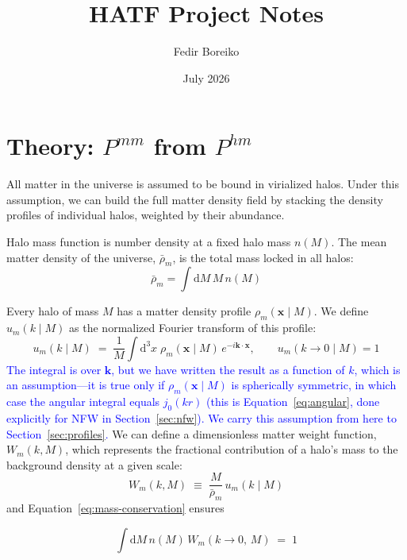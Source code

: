 \documentclass{article}
\title{HATF Project Notes}
\author{Fedir Boreiko}
\date{July 2026}
\newcommand{\dd}{\mathrm{d}}
\newcommand{\bx}{\mathbf{x}}
\newcommand{\bk}{\mathbf{k}}
\begin{document}
\section{Theory: $P^{mm}$ from $P^{hm}$}

All matter in the universe is assumed to be bound in virialized halos. Under this assumption, we can build the full matter density field by stacking the density profiles of individual halos, weighted by their abundance.

Halo mass function is number density at a fixed halo mass $n(M)$. The mean matter density of the universe, $\bar\rho_m$, is the total mass locked in all halos:
\begin{equation} \label{eq:mass-conservation}
    \bar\rho_m = \int \dd M \, M \, n(M)
\end{equation}

Every halo of mass $M$ has a matter density profile $\rho_m(\bx \mid M)$. We define $u_m(k \mid M)$ as the normalized Fourier transform of this profile:
\begin{equation} \label{eq:u_def}
    u_m(k \mid M) \;=\; \frac{1}{M} \int \dd^3x \; \rho_m(\bx \mid M) \, e^{-i \bk \cdot \bx},
    \qquad u_m(k\to 0 \mid M) = 1
\end{equation}
\textcolor{blue}{The integral is over $\bk$, but we have written the
result as a function of $k$, which is an assumption---it is true only if $\rho_m(\bx\mid M)$ is spherically symmetric, in
which case the angular integral equals $j_0(kr)$ (this is
Equation~\eqref{eq:angular}, done explicitly for NFW in
Section~\ref{sec:nfw}).
We carry this assumption from here to Section~\ref{sec:profiles}.}
We can define a dimensionless matter weight function, $W_m(k,M)$, which represents the fractional contribution of a halo's mass to the background density at a given scale:
\begin{equation} \label{eq:Wm}
    W_m(k,M) \;\equiv\; \frac{M}{\bar\rho_m} \, u_m(k \mid M)
\end{equation}
and Equation~\ref{eq:mass-conservation} ensures 

\begin{equation} \label{eq:sumrule}
    \int \dd M \, n(M)\, W_m(k\to 0, \,M) \;=\; 1
\end{equation}
\end{document}
